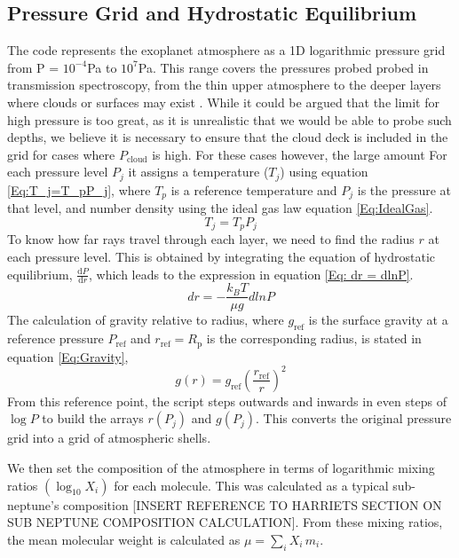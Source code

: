 \documentclass{article}
\begin{document}
\subsection{Pressure Grid and Hydrostatic Equilibrium}
\label{Section:Hydrostatic}
The code represents the exoplanet atmosphere as a 1D logarithmic pressure grid from P = $10^{-4}$Pa to $10^{7}$Pa.
This range covers the pressures probed probed in transmission spectroscopy, from the thin upper atmosphere to the deeper layers where clouds or surfaces may exist \cite{Madhusudhan2009-ir}.
While it could be argued that the limit for high pressure is too great, as it is unrealistic that we would be able to probe such depths, we believe it is necessary to ensure that the cloud deck is included in the grid for cases where $P_\mathrm{cloud}$ is high.
For these cases however, the large amount
For each pressure level $P_j$ it assigns a temperature ($T_j$) using equation \ref{Eq:T_j=T_pP_j}, where $T_p$ is a reference temperature and $P_j$ is the pressure at that level, and number density using the ideal gas law equation \ref{Eq:IdealGas}.
\begin{equation}
	T_j = T_p P_j
	\label{Eq:T_j=T_pP_j}
\end{equation}
To know how far rays travel through each layer, we need to find the radius $r$ at each pressure level.
This is obtained by integrating the equation of hydrostatic equilibrium, $ \frac{\mathrm{d}P}{\mathrm{d}r}$, which leads to the expression in equation \ref{Eq: dr = dlnP}.
\begin{equation} 
	dr = - \frac{k_BT}{\mu g}dlnP
	\label{Eq: dr = dlnP}
\end{equation}
The calculation of gravity relative to radius, where $g_\mathrm{ref}$ is the surface gravity at a reference pressure $P_\mathrm{ref}$ and $r_\mathrm{ref}=R_\mathrm{p}$ is the corresponding radius, is stated in equation \ref{Eq:Gravity},
\begin{equation}
	g(r) = g_\mathrm{ref} \left(\frac{r_\mathrm{ref}}{r}\right)^2
	\label{Eq:Gravity}
\end{equation}
From this reference point, the script steps outwards and inwards in even steps of $\log P$ to build the arrays $r(P_j)$ and $g(P_j)$. 
This converts the original pressure grid into a grid of atmospheric shells.

We then set the composition of the atmosphere in terms of logarithmic mixing ratios $(\log_{10} X_i)$ for each molecule. 
This was calculated as a typical sub-neptune's composition [INSERT REFERENCE TO HARRIETS SECTION ON SUB NEPTUNE COMPOSITION CALCULATION]. 
From these mixing ratios, the mean molecular weight is calculated as $\mu = \sum_i X_i\,m_i$.
\end{document}
